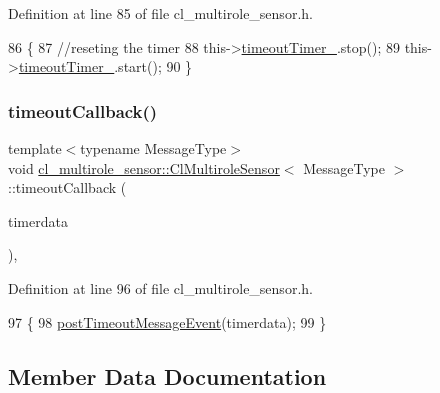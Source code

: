 Definition at line 85 of file cl\+\_\+multirole\+\_\+sensor.\+h.


\begin{DoxyCode}
86   \{
87     \textcolor{comment}{//reseting the timer}
88     this->\hyperlink{classcl__multirole__sensor_1_1ClMultiroleSensor_abd24848b13def072d7e89b830937439f}{timeoutTimer\_}.stop();
89     this->\hyperlink{classcl__multirole__sensor_1_1ClMultiroleSensor_abd24848b13def072d7e89b830937439f}{timeoutTimer\_}.start();
90   \}
\end{DoxyCode}
\mbox{\label{classcl__multirole__sensor_1_1ClMultiroleSensor_af09cd42f86b55e379a028cfd0387d76e}} 
\subsubsection{\texorpdfstring{timeout\+Callback()}{timeoutCallback()}}
{\footnotesize\ttfamily template$<$typename Message\+Type$>$ \\
void \hyperlink{classcl__multirole__sensor_1_1ClMultiroleSensor}{cl\+\_\+multirole\+\_\+sensor\+::\+Cl\+Multirole\+Sensor}$<$ Message\+Type $>$\+::timeout\+Callback (\begin{DoxyParamCaption}\item[{const ros\+::\+Timer\+Event \&}]{timerdata }\end{DoxyParamCaption})\hspace{0.3cm}{\ttfamily [inline]}, {\ttfamily [private]}}



Definition at line 96 of file cl\+\_\+multirole\+\_\+sensor.\+h.


\begin{DoxyCode}
97   \{
98     \hyperlink{classcl__multirole__sensor_1_1ClMultiroleSensor_a61a6e5dce7f1b34508701a8bc8f06ab9}{postTimeoutMessageEvent}(timerdata);
99   \}
\end{DoxyCode}


\subsection{Member Data Documentation}
\mbox{\label{classcl__multirole__sensor_1_1ClMultiroleSensor_a1f2bbfd7721308cb1eae4423d5fe999b}} 
